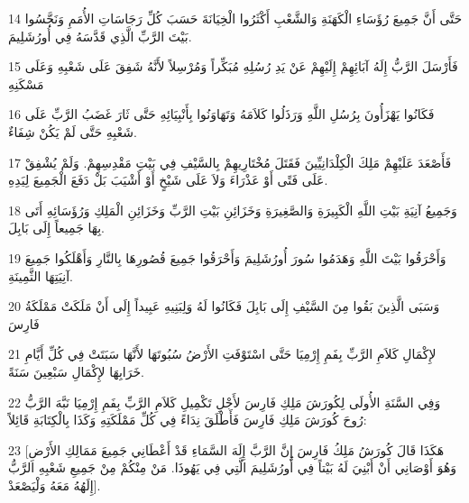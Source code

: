 \par 14 حَتَّى أَنَّ جَمِيعَ رُؤَسَاءِ الْكَهَنَةِ وَالشَّعْبِ أَكْثَرُوا الْخِيَانَةَ حَسَبَ كُلِّ رَجَاسَاتِ الأُمَمِ وَنَجَّسُوا بَيْتَ الرَّبِّ الَّذِي قَدَّسَهُ فِي أُورُشَلِيمَ.
\par 15 فَأَرْسَلَ الرَّبُّ إِلَهُ آبَائِهِمْ إِلَيْهِمْ عَنْ يَدِ رُسُلِهِ مُبَكِّراً وَمُرْسِلاً لأَنَّهُ شَفِقَ عَلَى شَعْبِهِ وَعَلَى مَسْكَنِهِ
\par 16 فَكَانُوا يَهْزَأُونَ بِرُسُلِ اللَّهِ وَرَذَلُوا كَلاَمَهُ وَتَهَاوَنُوا بِأَنْبِيَائِهِ حَتَّى ثَارَ غَضَبُ الرَّبِّ عَلَى شَعْبِهِ حَتَّى لَمْ يَكُنْ شِفَاءٌ.
\par 17 فَأَصْعَدَ عَلَيْهِمْ مَلِكَ الْكِلْدَانِيِّينَ فَقَتَلَ مُخْتَارِيهِمْ بِالسَّيْفِ فِي بَيْتِ مَقْدِسِهِمْ. وَلَمْ يُشْفِقْ عَلَى فَتًى أَوْ عَذْرَاءَ وَلاَ عَلَى شَيْخٍ أَوْ أَشْيَبَ بَلْ دَفَعَ الْجَمِيعَ لِيَدِهِ.
\par 18 وَجَمِيعُ آنِيَةِ بَيْتِ اللَّهِ الْكَبِيرَةِ وَالصَّغِيرَةِ وَخَزَائِنِ بَيْتِ الرَّبِّ وَخَزَائِنِ الْمَلِكِ وَرُؤَسَائِهِ أَتَى بِهَا جَمِيعاً إِلَى بَابِلَ.
\par 19 وَأَحْرَقُوا بَيْتَ اللَّهِ وَهَدَمُوا سُورَ أُورُشَلِيمَ وَأَحْرَقُوا جَمِيعَ قُصُورِهَا بِالنَّارِ وَأَهْلَكُوا جَمِيعَ آنِيَتِهَا الثَّمِينَةِ.
\par 20 وَسَبَى الَّذِينَ بَقُوا مِنَ السَّيْفِ إِلَى بَابِلَ فَكَانُوا لَهُ وَلِبَنِيهِ عَبِيداً إِلَى أَنْ مَلَكَتْ مَمْلَكَةُ فَارِسَ
\par 21 لإِكْمَالِ كَلاَمِ الرَّبِّ بِفَمِ إِرْمِيَا حَتَّى اسْتَوْفَتِ الأَرْضُ سُبُوتَهَا لأَنَّهَا سَبَتَتْ فِي كُلِّ أَيَّامِ خَرَابِهَا لإِكْمَالِ سَبْعِينَ سَنَةً.
\par 22 وَفِي السَّنَةِ الأُولَى لِكُورَشَ مَلِكِ فَارِسَ لأَجْلِ تَكْمِيلِ كَلاَمِ الرَّبِّ بِفَمِ إِرْمِيَا نَبَّهَ الرَّبُّ رُوحَ كُورَشَ مَلِكِ فَارِسَ فَأَطْلَقَ نِدَاءً فِي كُلِّ مَمْلَكَتِهِ وَكَذَا بِالْكِتَابَةِ قَائِلاً:
\par 23 [هَكَذَا قَالَ كُورَشُ مَلِكُ فَارِسَ إِنَّ الرَّبَّ إِلَهَ السَّمَاءِ قَدْ أَعْطَانِي جَمِيعَ مَمَالِكِ الأَرْضِ وَهُوَ أَوْصَانِي أَنْ أَبْنِيَ لَهُ بَيْتاً فِي أُورُشَلِيمَ الَّتِي فِي يَهُوذَا. مَنْ مِنْكُمْ مِنْ جَمِيعِ شَعْبِهِ الرَّبُّ إِلَهُهُ مَعَهُ وَلْيَصْعَدْ].

